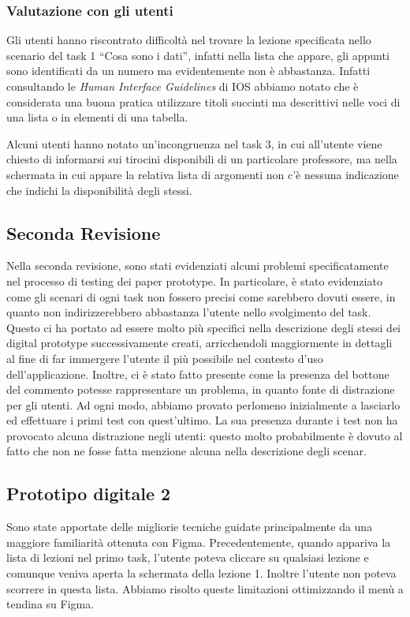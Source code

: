 \subsubsection{Valutazione con gli utenti}
Gli utenti hanno riscontrato difficoltà nel trovare la lezione specificata nello scenario del task 1 “Cosa sono i dati”, infatti nella lista che appare, gli appunti sono identificati da un numero
ma evidentemente non è abbastanza. Infatti consultando le \textit{Human Interface Guidelines} di IOS abbiamo notato che è considerata una buona pratica utilizzare titoli succinti ma descrittivi nelle voci di una lista o in elementi di una tabella.

Alcuni utenti hanno notato un’incongruenza nel task 3, in cui all’utente viene chiesto di informarsi sui tirocini disponibili di un particolare professore, ma nella schermata in cui appare la relativa
lista di argomenti non c’è nessuna indicazione che indichi la disponibilità degli stessi.

\subsection{Seconda Revisione}
Nella seconda revisione, sono stati evidenziati alcuni problemi specificatamente nel processo di testing dei paper prototype. In particolare, è stato evidenziato come gli scenari di ogni task non fossero precisi come sarebbero dovuti essere, in quanto non indirizzerebbero abbastanza l’utente nello svolgimento del task. Questo ci ha portato ad essere molto più specifici nella descrizione degli stessi dei digital prototype successivamente creati, arricchendoli maggiormente in dettagli al fine di far immergere l’utente il più possibile nel contesto d’uso dell’applicazione. Inoltre, ci è stato fatto presente come la presenza del bottone del commento potesse rappresentare un problema, in quanto fonte di distrazione per gli utenti. Ad ogni modo, abbiamo provato perlomeno inizialmente a lasciarlo ed effettuare i primi test con quest’ultimo. La sua presenza durante i test non ha provocato alcuna distrazione negli utenti: questo molto probabilmente è dovuto al fatto che non ne fosse fatta menzione alcuna nella descrizione degli scenar.

\subsection{Prototipo digitale 2}
Sono state apportate delle migliorie tecniche guidate principalmente da una maggiore familiarità ottenuta con Figma.
Precedentemente, quando appariva la lista di lezioni nel primo task, l’utente poteva cliccare su qualsiasi lezione e comunque veniva aperta la schermata della lezione 1. Inoltre l’utente non poteva
scorrere in questa lista. Abbiamo risolto queste limitazioni ottimizzando il menù a tendina su Figma.

